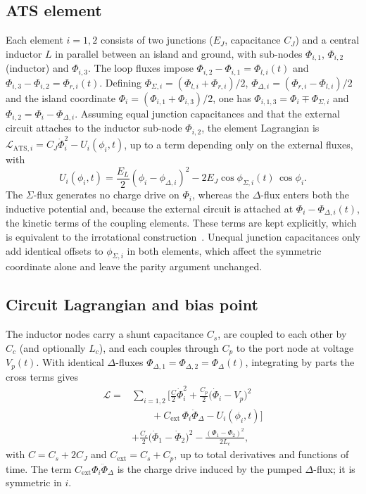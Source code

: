 \documentclass[aps,prx,reprint,floatfix,amsmath,amssymb,longbibliography]{revtex4-2}
\begin{document}
\subsection{ATS element}

Each element $i=1,2$ consists of two junctions ($E_J$, capacitance $C_J$)
and a central inductor $L$ in parallel between an island and ground, with
sub-nodes $\Phi_{i,1}$, $\Phi_{i,2}$ (inductor) and $\Phi_{i,3}$. The loop
fluxes impose $\Phi_{i,2}-\Phi_{i,1}=\Phi_{l,i}(t)$ and
$\Phi_{i,3}-\Phi_{i,2}=\Phi_{r,i}(t)$. Defining
$\Phi_{\Sigma,i}=(\Phi_{l,i}+\Phi_{r,i})/2$,
$\Phi_{\Delta,i}=(\Phi_{r,i}-\Phi_{l,i})/2$ and the island coordinate
$\Phi_i=(\Phi_{i,1}+\Phi_{i,3})/2$, one has
$\Phi_{i,1,3}=\Phi_i\mp\Phi_{\Sigma,i}$ and $\Phi_{i,2}=\Phi_i-\Phi_{\Delta,i}$.
Assuming equal junction capacitances and that the external circuit
attaches to the inductor sub-node $\Phi_{i,2}$, the element Lagrangian is
$\mathcal{L}_{\mathrm{ATS},i}=C_J\dot{\Phi}_i^2-U_i(\phi_i,t)$, up to a
term depending only on the external fluxes, with
\begin{equation}
  U_i(\phi_i,t)=\frac{E_L}{2}\left(\phi_i-\phi_{\Delta,i}\right)^2
  -2E_J\cos\phi_{\Sigma,i}(t)\,\cos\phi_i .
  \label{eq:app_U}
\end{equation}
The $\Sigma$-flux generates no charge drive on $\Phi_i$, whereas the
$\Delta$-flux enters both the inductive potential and, because the
external circuit is attached at $\Phi_i-\Phi_{\Delta,i}(t)$, the kinetic
terms of the coupling elements. These terms are kept explicitly, which is
equivalent to the irrotational construction~\cite{You2019May}. Unequal
junction capacitances only add identical offsets to $\phi_{\Sigma,i}$ in
both elements, which affect the symmetric coordinate alone and leave the
parity argument unchanged.

\subsection{Circuit Lagrangian and bias point}

The inductor nodes carry a shunt capacitance $C_s$, are coupled to each
other by $C_c$ (and optionally $L_c$), and each couples through $C_p$ to
the port node at voltage $V_p(t)$. With identical $\Delta$-fluxes
$\Phi_{\Delta,1}=\Phi_{\Delta,2}=\Phi_\Delta(t)$, integrating by parts the
cross terms gives
\begin{equation}
\begin{aligned}
  \mathcal{L}={}&\sum_{i=1,2}\Big[\frac{C}{2}\dot{\Phi}_i^2
  +\frac{C_p}{2}\big(\dot{\Phi}_i-V_p\big)^2\\
  &\qquad+C_{\mathrm{ext}}\,\Phi_i\ddot{\Phi}_\Delta-U_i(\phi_i,t)\Big]\\
  &+\frac{C_c}{2}\big(\dot{\Phi}_1-\dot{\Phi}_2\big)^2
  -\frac{(\Phi_1-\Phi_2)^2}{2L_c},
\end{aligned}
\label{eq:app_L}
\end{equation}
with $C=C_s+2C_J$ and $C_{\mathrm{ext}}=C_s+C_p$, up to total derivatives
and functions of time. The term $C_{\mathrm{ext}}\Phi_i\ddot{\Phi}_\Delta$
is the charge drive induced by the pumped $\Delta$-flux; it is symmetric
in $i$.
\end{document}
